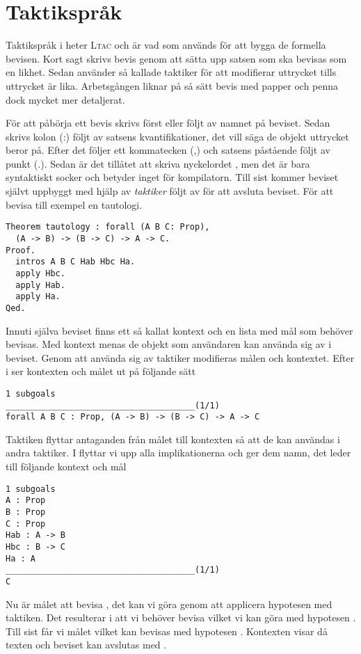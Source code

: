 \section{Taktikspråk}
Taktikspråk i \coq{} heter \textsc{Ltac} och är vad som används för att bygga
de formella bevisen. Kort sagt skrivs bevis genom att sätta upp satsen som ska
bevisas som en likhet. Sedan använder så kallade taktiker för att modifierar
uttrycket tills uttrycket är lika. Arbetsgången liknar på så sätt bevis med
papper och penna dock mycket mer detaljerat.

För att påbörja ett bevis skrivs först  eller  följt av
namnet på beviset. Sedan skrivs kolon (:) följt av satsens kvantifikationer,
det vill säga de objekt uttrycket beror på. Efter det följer ett kommatecken
(,) och satsens påstående följt av punkt (.). Sedan är det tillåtet att skriva
nyckelordet , men det är bara syntaktiskt socker och betyder inget för
kompilatorn. Till sist kommer beviset självt uppbyggt med hjälp av
\emph{taktiker} följt av  för att avsluta beviset. För att bevisa till
exempel en tautologi.

\begin{lstlisting}
Theorem tautology : forall (A B C: Prop),
  (A -> B) -> (B -> C) -> A -> C.
Proof.
  intros A B C Hab Hbc Ha.
  apply Hbc.
  apply Hab.
  apply Ha.
Qed.
\end{lstlisting}

Innuti själva beviset finns ett så kallat kontext och en lista med mål som
behöver bevisas. Med kontext menas de objekt som användaren kan använda sig av
i beviset. Genom att använda sig av taktiker modifieras målen och kontextet.
Efter  i  ser kontexten och målet ut på följande sätt
\begin{lstlisting}
1 subgoals
______________________________________(1/1)
forall A B C : Prop, (A -> B) -> (B -> C) -> A -> C
\end{lstlisting}

Taktiken  flyttar antaganden från målet till kontexten så att de kan
användas i andra taktiker. I  flyttar vi upp alla implikationerna
och ger dem namn, det leder till följande kontext och mål
\begin{lstlisting}
1 subgoals
A : Prop
B : Prop
C : Prop
Hab : A -> B
Hbc : B -> C
Ha : A
______________________________________(1/1)
C
\end{lstlisting}

Nu är målet att bevisa , det kan vi göra genom att applicera hypotesen
 med  taktiken. Det resulterar i att vi behöver bevisa 
vilket vi kan göra med hypotesen . Till sist får vi målet  vilket
kan bevisas med hypotesen . Kontexten visar då texten  och beviset kan avslutas med .
